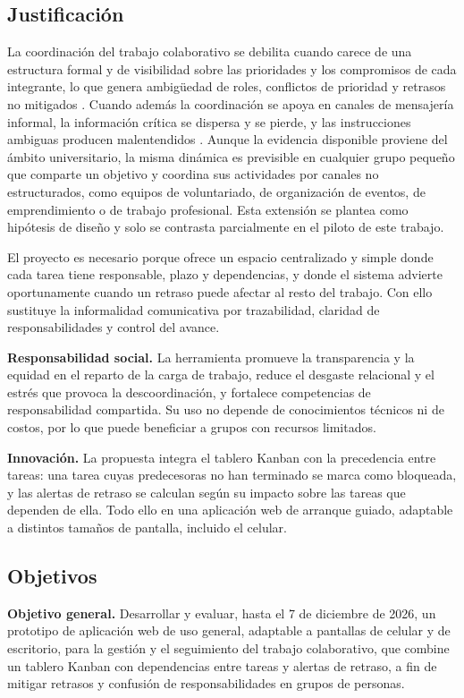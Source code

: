 \documentclass[conference]{IEEEtran}
\begin{document}
\subsection{Justificación}
La coordinación del trabajo colaborativo se debilita cuando carece de una estructura formal y de visibilidad sobre las prioridades y los compromisos de cada integrante, lo que genera ambigüedad de roles, conflictos de prioridad y retrasos no mitigados \cite{hussein2021addressing}. Cuando además la coordinación se apoya en canales de mensajería informal, la información crítica se dispersa y se pierde, y las instrucciones ambiguas producen malentendidos \cite{vilches2019limitaciones}. Aunque la evidencia disponible proviene del ámbito universitario, la misma dinámica es previsible en cualquier grupo pequeño que comparte un objetivo y coordina sus actividades por canales no estructurados, como equipos de voluntariado, de organización de eventos, de emprendimiento o de trabajo profesional. Esta extensión se plantea como hipótesis de diseño y solo se contrasta parcialmente en el piloto de este trabajo.

El proyecto es necesario porque ofrece un espacio centralizado y simple donde cada tarea tiene responsable, plazo y dependencias, y donde el sistema advierte oportunamente cuando un retraso puede afectar al resto del trabajo. Con ello sustituye la informalidad comunicativa por trazabilidad, claridad de responsabilidades y control del avance.

\textbf{Responsabilidad social.} La herramienta promueve la transparencia y la equidad en el reparto de la carga de trabajo, reduce el desgaste relacional y el estrés que provoca la descoordinación, y fortalece competencias de responsabilidad compartida. Su uso no depende de conocimientos técnicos ni de costos, por lo que puede beneficiar a grupos con recursos limitados.

\textbf{Innovación.} La propuesta integra el tablero Kanban con la precedencia entre tareas: una tarea cuyas predecesoras no han terminado se marca como bloqueada, y las alertas de retraso se calculan según su impacto sobre las tareas que dependen de ella. Todo ello en una aplicación web de arranque guiado, adaptable a distintos tamaños de pantalla, incluido el celular.

\subsection{Objetivos}
\textbf{Objetivo general.} Desarrollar y evaluar, hasta el 7 de diciembre de 2026, un prototipo de aplicación web de uso general, adaptable a pantallas de celular y de escritorio, para la gestión y el seguimiento del trabajo colaborativo, que combine un tablero Kanban con dependencias entre tareas y alertas de retraso, a fin de mitigar retrasos y confusión de responsabilidades en grupos de personas.
\end{document}

